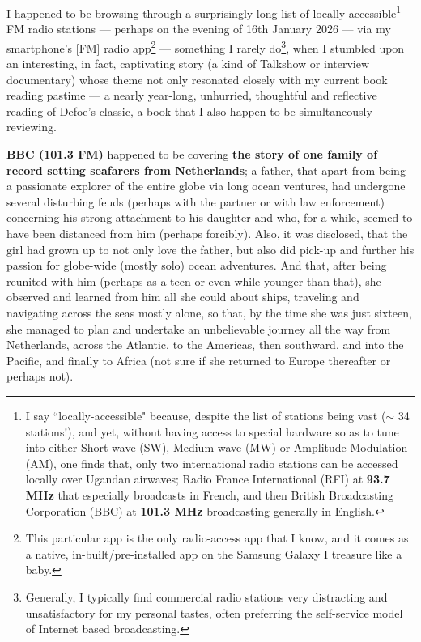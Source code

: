 \documentclass[a4paper]{article}
\begin{document}
I happened to be browsing through a surprisingly long list of locally-accessible\footnote{I say ``locally-accessible" because, despite the list of stations being vast ($\sim$ 34 stations!), and yet, without having access to special hardware so as to tune into either Short-wave (SW), Medium-wave (MW) or Amplitude Modulation (AM), one finds that, only two international radio stations can be accessed locally over Ugandan airwaves; Radio France International (RFI) at \textbf{93.7 MHz} that especially broadcasts in French, and then British Broadcasting Corporation (BBC) at \textbf{101.3 MHz} broadcasting generally in English.} FM radio stations --- perhaps on the evening of 16th January 2026 --- via my smartphone's [FM] radio app\footnote{This particular app is the only radio-access app that I know, and it comes as a native, in-built/pre-installed app on the Samsung Galaxy I treasure like a baby.} --- something I rarely do\footnote{Generally, I typically find commercial radio stations very distracting and unsatisfactory for my personal tastes, often preferring the self-service model of Internet based broadcasting.}, when I stumbled upon an interesting, in fact, captivating story (a kind of Talkshow or interview documentary) whose theme not only resonated closely with my current book reading pastime --- a nearly year-long, unhurried, thoughtful and reflective reading of Defoe's classic, a book that I also happen to be simultaneously reviewing.

\textbf{BBC (101.3 FM)} happened to be covering \textbf{the story of one family of record setting seafarers from Netherlands}; a father, that apart from being a passionate explorer of the entire globe via long ocean ventures, had undergone several disturbing feuds (perhaps with the partner or with law enforcement) concerning his strong attachment to his daughter and who, for a while, seemed to have been distanced from him (perhaps forcibly). Also, it was disclosed, that the girl had grown up to not only love the father, but also did pick-up and further his passion for globe-wide (mostly solo) ocean adventures. And that, after being reunited with him (perhaps as a teen or even while younger than that), she observed and learned from him all she could about ships, traveling and navigating across the seas mostly alone, so that, by the time she was just sixteen, she managed to plan and undertake an unbelievable journey all the way from Netherlands, across the Atlantic, to the Americas, then southward, and into the Pacific, and finally to Africa (not sure if she returned to Europe thereafter or perhaps not). 
\end{document}
